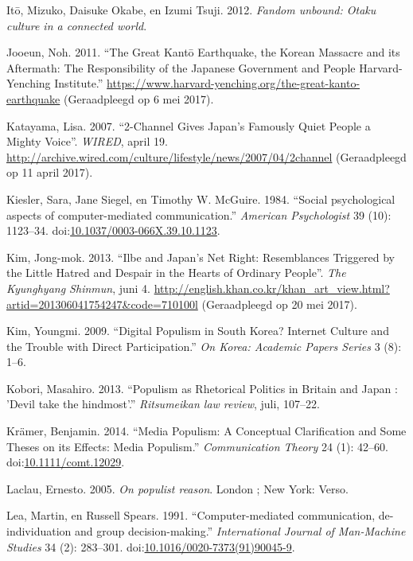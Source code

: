 \documentclass[10.5pt,dutch,]{article}
\begin{document}
\hypertarget{ref-itoux5ffandomux5f2012}{}
Itō, Mizuko, Daisuke Okabe, en Izumi Tsuji. 2012. \emph{Fandom unbound:
Otaku culture in a connected world}.

\hypertarget{ref-jooeunux5fgreatux5f2011}{}
Jooeun, Noh. 2011. “The Great Kantō Earthquake, the Korean Massacre and
its Aftermath: The Responsibility of the Japanese Government and People
\textbar{} Harvard-Yenching Institute.” 
\url{https://www.harvard-yenching.org/the-great-kanto-earthquake} (Geraadpleegd op 6 mei 2017).

\hypertarget{ref-katayamaux5f2-channelux5f2007}{}
Katayama, Lisa. 2007. “2-Channel Gives Japan’s Famously Quiet People a Mighty Voice”. \emph{WIRED}, april 19. \url{http://archive.wired.com/culture/lifestyle/news/2007/04/2channel} (Geraadpleegd op 11 april 2017).

\hypertarget{ref-kieslerux5fsocialux5f1984}{}
Kiesler, Sara, Jane Siegel, en Timothy W. McGuire. 1984. “Social
psychological aspects of computer-mediated communication.”  \emph{American
Psychologist} 39 (10): 1123--34.
doi:\href{https://doi.org/10.1037/0003-066X.39.10.1123}{10.1037/0003-066X.39.10.1123}.

\hypertarget{ref-kimux5filbeux5f2013}{}
Kim, Jong-mok. 2013. “Ilbe and Japan’s Net Right: Resemblances Triggered by the Little Hatred and Despair in the Hearts of Ordinary People”. \emph{The Kyunghyang Shinmun}, juni 4.  \url{http://english.khan.co.kr/khan_art_view.html?artid=201306041754247&code=710100l} (Geraadpleegd op 20 mei 2017).

\hypertarget{ref-kimux5fdigitalux5f2009}{}
Kim, Youngmi. 2009. “Digital Populism in South Korea? Internet Culture
and the Trouble with Direct Participation.”  \emph{On Korea: Academic
Papers Series} 3 (8): 1--6.

\hypertarget{ref-koboriux5fpopulismux5f2013}{}
Kobori, Masahiro. 2013. “Populism as Rhetorical Politics in Britain and
Japan : 'Devil take the hindmost'.” \emph{Ritsumeikan law review}, juli,
107--22.

\hypertarget{ref-kramerux5fmediaux5f2014}{}
Krämer, Benjamin. 2014. “Media Populism: A Conceptual Clarification and
Some Theses on its Effects: Media Populism.” \emph{Communication Theory}
24 (1): 42--60. 
doi:\href{https://doi.org/10.1111/comt.12029}{10.1111/comt.12029}.

\hypertarget{ref-laclauux5fpopulistux5f2005}{}
Laclau, Ernesto. 2005. \emph{On populist reason}. London ; New York:
Verso.

\hypertarget{ref-leaux5fcomputer-mediatedux5f1991}{}
Lea, Martin, en Russell Spears. 1991. “Computer-mediated communication,
de-individuation and group decision-making.”  \emph{International Journal
of Man-Machine Studies} 34 (2): 283--301.
doi:\href{https://doi.org/10.1016/0020-7373(91)90045-9}{10.1016/0020-7373(91)90045-9}.
\end{document}
